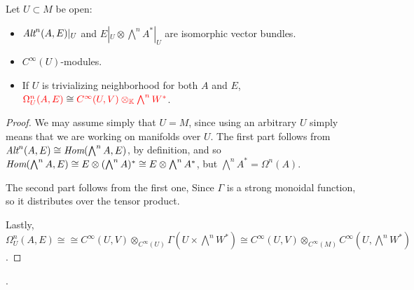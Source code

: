 \lin

\begin{proposition}\label{propositionIsomorphOmegas}
Let $U\subset M$ be open:
    \begin{itemize}
    
    \item $\operatorname{\textit{Alt}}^n(A, E)|_U$ and $E|_U \otimes \bigwedge^n A^*|_U$ are isomorphic vector bundles.
    
    
    \item {} $C^\infty(U)$-modules.
    
    \item If $U$ is trivializing neighborhood for both $A$ and $E$, $\textcolor{red}{\Omega_U^n(A, E)} \cong \textcolor{red}{ C^\infty(U, V) \otimes_{\mathbb{K}} \bigwedge^n W^*}$.
    
    
    \end{itemize}
\end{proposition}

\begin{proof}
We may assume simply that $U = M$, since using an arbitrary $U$ simply means that we are working on manifolds over $U$. The first part follows from $\operatorname{\textit{Alt}}^n(A, E) \cong \operatorname{\textit{Hom}}(\bigwedge^n A, E)$, by definition, and so $\operatorname{\textit{Hom}}(\bigwedge^n A, E) \cong E \otimes (\bigwedge^n A)^* \cong E \otimes \bigwedge^n A^*$, but $\bigwedge^n A^* = \Omega^n(A)$.

The second part follows from the first one, Since $\Gamma$ is a strong monoidal function, so it distributes over the tensor product.

Lastly, $\Omega_U^n(A, E) \cong \cong C^\infty(U, V) \otimes_{C^\infty(U)} \Gamma(U \times \bigwedge^n W^*) \cong C^\infty(U, V) \otimes_{C^\infty(M)} C^\infty\left(U, \bigwedge^n W^* \right)$.
\end{proof}

\linea


.

